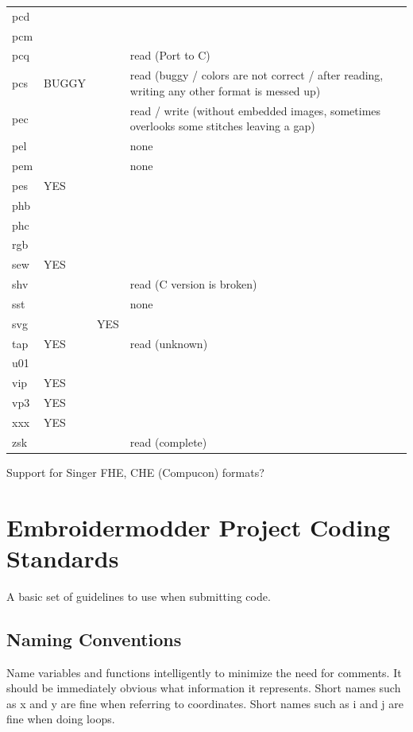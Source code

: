 \documentclass[a4paper, 11pt]{report}
\begin{document}
\begin{tabular}{l l l l}
pcd    &       &       &  \\
pcm    &       &       & \\
pcq    &       &       & read (Port to C)\\
pcs    & BUGGY &       & read (buggy / colors are not correct / after reading, writing any other format is messed up)\\
pec    &       &       & read / write (without embedded images, sometimes overlooks some stitches leaving a gap)\\
pel    &       &       & none\\
pem    &       &       & none\\
pes    & YES   &       & \\
phb    &       &       & \\
phc    &       &       & \\
rgb    &       &       & \\
sew    & YES   &       & \\
shv    &       &       & read (C version is broken)\\
sst    &       &       & none\\
svg    &       & YES   & \\
tap    & YES   &       & read (unknown)\\
u01    &       &       & \\
vip    & YES   &       & \\
vp3    & YES   &       & \\
xxx    & YES   &       & \\
zsk    &       &       & read (complete)
\end{tabular}

Support for Singer FHE, CHE (Compucon) formats?

\section{Embroidermodder Project Coding Standards}

A basic set of guidelines to use when submitting code.

\subsection{Naming Conventions}

Name variables and functions intelligently to minimize the need for comments.
It should be immediately obvious what information it represents.
Short names such as x and y are fine when referring to coordinates.
Short names such as i and j are fine when doing loops.
\end{document}

